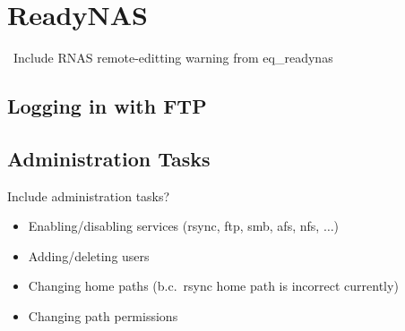 
\chapter{ReadyNAS}
\label{sec:op_readynas}

\FIXME\ Include RNAS remote-editting warning from eq\_readynas

\section{Logging in with FTP}
\label{sec:op_readynas:ftp}

\section{Administration Tasks}

Include administration tasks?
\begin{itemize}
\item Enabling/disabling services (rsync, ftp, smb, afs, nfs, $\ldots$)
\item Adding/deleting users
\item Changing home paths (b.c.\ rsync home path is incorrect currently)
\item Changing path permissions
\end{itemize}


